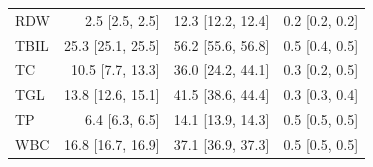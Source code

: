 \begin{table}[ht]
\begin{tabular}{lrrr}
RDW & 2.5 [2.5, 2.5] & 12.3 [12.2, 12.4] & 0.2 [0.2, 0.2] \\
TBIL & 25.3 [25.1, 25.5] & 56.2 [55.6, 56.8] & 0.5 [0.4, 0.5] \\
TC & 10.5 [7.7, 13.3] & 36.0 [24.2, 44.1] & 0.3 [0.2, 0.5] \\
TGL & 13.8 [12.6, 15.1] & 41.5 [38.6, 44.4] & 0.3 [0.3, 0.4] \\
TP & 6.4 [6.3, 6.5] & 14.1 [13.9, 14.3] & 0.5 [0.5, 0.5] \\
WBC & 16.8 [16.7, 16.9] & 37.1 [36.9, 37.3] & 0.5 [0.5, 0.5] \\
\bottomrule
\end{tabular}
\label{tab:08_variability}
\end{table}